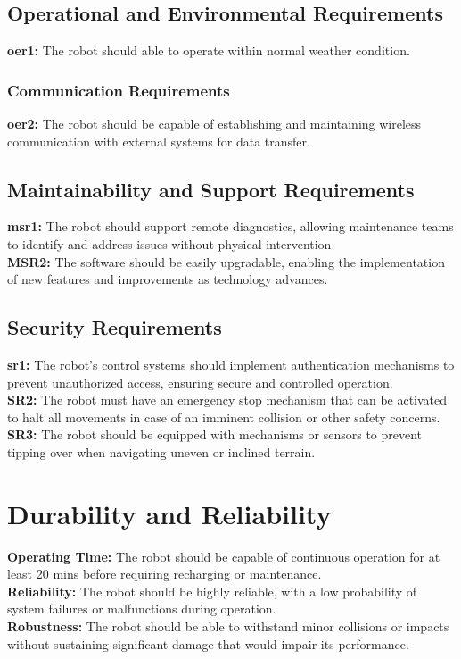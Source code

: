 \documentclass[12pt]{article}
\begin{document}
\subsection{Operational and Environmental Requirements}
\noindent\textbf{\acrshort{oer}1:} The robot should able to operate within normal weather condition. \\
\subsubsection{Communication Requirements}
\noindent\textbf{\acrshort{oer}2:} The robot should be capable of establishing and maintaining wireless communication with external systems for data transfer.\\


\subsection{Maintainability and Support Requirements}
\noindent\textbf{\acrshort{msr}1:} The robot should support remote diagnostics, allowing maintenance teams to identify and address issues without physical intervention.\\
\noindent\textbf{MSR2:} The software should be easily upgradable, enabling the implementation of new features and improvements as technology advances.\\

\subsection{Security Requirements}
\noindent\textbf{\acrshort{sr}1:} The robot's control systems should implement authentication mechanisms to prevent unauthorized access, ensuring secure and controlled operation.\\
\noindent\textbf{SR2:} The robot must have an emergency stop mechanism that can be activated to halt all movements in case of an imminent collision or other safety concerns.\\
\noindent\textbf{SR3:} The robot should be equipped with mechanisms or sensors to prevent tipping over when navigating uneven or inclined terrain.\\


\section{Durability and Reliability}
\noindent\textbf{Operating Time:} The robot should be capable of continuous operation for at least 20 mins before requiring recharging or maintenance.\\
\noindent\textbf{Reliability:} The robot should be highly reliable, with a low probability of system failures or malfunctions during operation.\\
\noindent\textbf{Robustness:} The robot should be able to withstand minor collisions or impacts without sustaining significant damage that would impair its performance.\\
\end{document}
